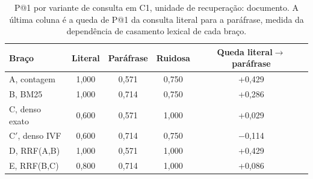 \begin{table}[htb]
\centering
\caption{P@1 por variante de consulta em C1, unidade de recuperação: documento. A última coluna é a queda de P@1 da consulta literal para a paráfrase, medida da dependência de casamento lexical de cada braço.}
\label{tab:retrieval-variants}
\begin{tabular}{lcccc}
\toprule
Braço & Literal & Paráfrase & Ruidosa & Queda literal$\rightarrow$paráfrase \\
\midrule
A, contagem & 1{,}000 & 0{,}571 & 0{,}750 & +0{,}429 \\
B, BM25 & 1{,}000 & 0{,}714 & 0{,}750 & +0{,}286 \\
C, denso exato & 0{,}600 & 0{,}571 & 1{,}000 & +0{,}029 \\
C$'$, denso IVF & 0{,}600 & 0{,}714 & 0{,}750 & $-$0{,}114 \\
D, RRF(A,B) & 1{,}000 & 0{,}571 & 1{,}000 & +0{,}429 \\
E, RRF(B,C) & 0{,}800 & 0{,}714 & 1{,}000 & +0{,}086 \\
\bottomrule
\end{tabular}
\end{table}
